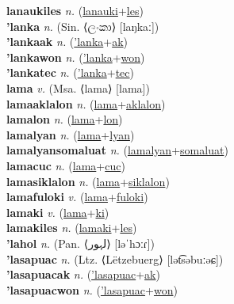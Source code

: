 \textbf{lanaukiles} \textit{n.} (\hyperref[lanauki]{lanauki}+\hyperref[les]{les})
 \label{lanaukiles} \\
\textbf{'lanka} \textit{n.} (Sin. ⟨ලංකා⟩ [laŋkaː])
 \label{'lanka} \\
\textbf{'lankaak} \textit{n.} (\hyperref['lanka]{'lanka}+\hyperref[ak]{ak})
 \label{'lankaak} \\
\textbf{'lankawon} \textit{n.} (\hyperref['lanka]{'lanka}+\hyperref[won]{won})
 \label{'lankawon} \\
\textbf{'lankatec} \textit{n.} (\hyperref['lanka]{'lanka}+\hyperref[tec]{tec})
 \label{'lankatec} \\
\textbf{lama} \textit{v.} (Msa. ⟨lama⟩ [lama])
 \label{lama} \\
\textbf{lamaaklalon} \textit{n.} (\hyperref[lama]{lama}+\hyperref[aklalon]{aklalon})
 \label{lamaaklalon} \\
\textbf{lamalon} \textit{n.} (\hyperref[lama]{lama}+\hyperref[lon]{lon})
 \label{lamalon} \\
\textbf{lamalyan} \textit{n.} (\hyperref[lama]{lama}+\hyperref[lyan]{lyan})
 \label{lamalyan} \\
\textbf{lamalyansomaluat} \textit{n.} (\hyperref[lamalyan]{lamalyan}+\hyperref[somaluat]{somaluat})
 \label{lamalyansomaluat} \\
\textbf{lamacuc} \textit{n.} (\hyperref[lama]{lama}+\hyperref[cuc]{cuc})
 \label{lamacuc} \\
\textbf{lamasiklalon} \textit{n.} (\hyperref[lama]{lama}+\hyperref[siklalon]{siklalon})
 \label{lamasiklalon} \\
\textbf{lamafuloki} \textit{v.} (\hyperref[lama]{lama}+\hyperref[fuloki]{fuloki})
 \label{lamafuloki} \\
\textbf{lamaki} \textit{v.} (\hyperref[lama]{lama}+\hyperref[ki]{ki})
 \label{lamaki} \\
\textbf{lamakiles} \textit{n.} (\hyperref[lamaki]{lamaki}+\hyperref[les]{les})
 \label{lamakiles} \\
\textbf{'lahol} \textit{n.} (Pan. ⟨لہور⟩ [ləˈhɔːɾ])
 \label{'lahol} \\
\textbf{'lasapuac} \textit{n.} (Ltz. ⟨Lëtzebuerg⟩ [lət͡səbuːəɕ])
 \label{'lasapuac} \\
\textbf{'lasapuacak} \textit{n.} (\hyperref['lasapuac]{'lasapuac}+\hyperref[ak]{ak})
 \label{'lasapuacak} \\
\textbf{'lasapuacwon} \textit{n.} (\hyperref['lasapuac]{'lasapuac}+\hyperref[won]{won})
 \label{'lasapuacwon} \\
